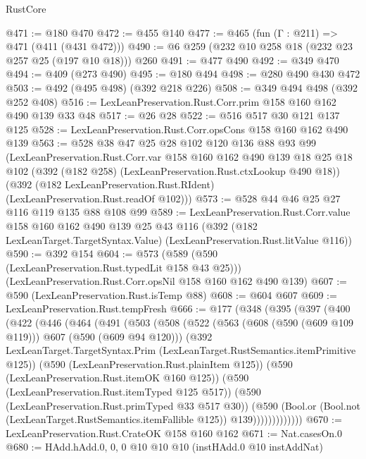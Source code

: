 \begin{lexlean}{RustCore}
\begin{coremodule}
@471 := @180 @470
@472 := @455 @140
@477 := @465 (fun (Γ : @211) => @471 (@411 (@431 @472)))
@490 := @6 @259 (@232 @10 @258 @18 (@232 @23 @257 @25 (@197 @10 @18))) @260
@491 := @477 @490
@492 := @349 @470
@494 := @409 (@273 @490)
@495 := @180 @494
@498 := @280 @490 @430 @472
@503 := @492 (@495 @498) (@392 @218 @226)
@508 := @349 @494 @498 (@392 @252 @408)
@516 := LexLeanPreservation.Rust.Corr.prim @158 @160 @162 @490 @139 @33 @48
@517 := @26 @28
@522 := @516 @517 @30 @121 @137 @125
@528 := LexLeanPreservation.Rust.Corr.opsCons @158 @160 @162 @490 @139
@563 := @528
    @38
    @47
    @25
    @28
    @102
    @120
    @136
    @88
    @93
    @99
    (LexLeanPreservation.Rust.Corr.var
      @158
      @160
      @162
      @490
      @139
      @18
      @25
      @18
      @102
      (@392 (@182 @258) (LexLeanPreservation.Rust.ctxLookup @490 @18))
      (@392 (@182 LexLeanPreservation.Rust.RIdent) (LexLeanPreservation.Rust.readOf @102)))
@573 := @528 @44 @46 @25 @27 @116 @119 @135 @88 @108 @99
@589 := LexLeanPreservation.Rust.Corr.value
    @158
    @160
    @162
    @490
    @139
    @25
    @43
    @116
    (@392 (@182 LexLeanTarget.TargetSyntax.Value) (LexLeanPreservation.Rust.litValue @116))
@590 := @392 @154
@604 := @573
    (@589 (@590 (LexLeanPreservation.Rust.typedLit @158 @43 @25)))
    (LexLeanPreservation.Rust.Corr.opsNil @158 @160 @162 @490 @139)
@607 := @590 (LexLeanPreservation.Rust.isTemp @88)
@608 := @604 @607
@609 := LexLeanPreservation.Rust.tempFresh
@666 := @177
    (@348
      (@395
        (@397
          (@400
            (@422
              (@446
                (@464
                  (@491
                    (@503
                      (@508
                        (@522
                          (@563 (@608 (@590 (@609 @109 @119))) @607 (@590 (@609 @94 @120)))
                          (@392
                            LexLeanTarget.TargetSyntax.Prim
                            (LexLeanTarget.RustSemantics.itemPrimitive @125))
                          (@590 (LexLeanPreservation.Rust.plainItem @125))
                          (@590 (LexLeanPreservation.Rust.itemOK @160 @125))
                          (@590 (LexLeanPreservation.Rust.itemTyped @125 @517))
                          (@590 (LexLeanPreservation.Rust.primTyped @33 @517 @30))
                          (@590
                            (Bool.or
                              (Bool.not (LexLeanTarget.RustSemantics.itemFallible @125))
                              @139)))))))))))))
@670 := LexLeanPreservation.Rust.CrateOK @158 @160 @162
@671 := Nat.casesOn.{0}
@680 := HAdd.hAdd.{0, 0, 0} @10 @10 @10 (instHAdd.{0} @10 instAddNat)

\end{coremodule}
\end{lexlean}
